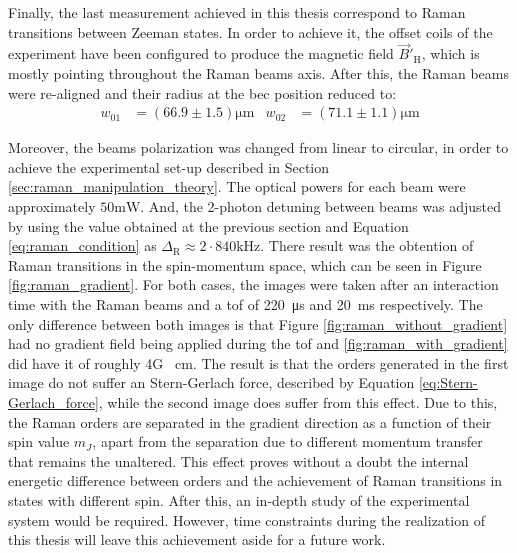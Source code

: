 Finally, the last measurement achieved in this thesis correspond to Raman transitions between Zeeman states. In order to achieve it, the offset coils of the experiment have been configured to produce the magnetic field $\vec{B}'_\text{H}$, which is mostly pointing throughout the Raman beams axis. After this, the Raman beams were re-aligned and their radius at the \ac{bec} position reduced to:
\begin{align*}
	w_{01} &= (66.9\pm1.5)\si{\micro\meter}   &   w_{02} &= (71.1\pm 1.1)\si{\micro\meter}
\end{align*}

Moreover, the beams polarization was changed from linear to circular, in order to achieve the experimental set-up described in Section \ref{sec:raman_manipulation_theory}. The optical powers for each beam were approximately $50\si{\milli\watt}$. And, the 2-photon detuning between beams was adjusted by using the value obtained at the previous section and Equation \eqref{eq:raman_condition} as $\Delta_\text{R} \approx 2\cdot840 \si{\kilo\hertz}$. There result was the obtention of Raman transitions in the spin-momentum space, which can be seen in Figure \ref{fig:raman_gradient}. For both cases, the images were taken after an interaction time with the Raman beams and a \ac{tof} of \SI{220}{\micro\second} and \SI{20}{\milli\second} respectively. The only difference between both images is that Figure \ref{fig:raman_without_gradient} had no gradient field being applied during the \ac{tof} and \ref{fig:raman_with_gradient} did have it of roughly 4G \si{\per\centi\meter}. The result is that the orders generated in the first image do not suffer an Stern-Gerlach force, described by Equation \ref{eq:Stern-Gerlach_force}, while the second image does suffer from this effect. Due to this, the Raman orders are separated in the gradient direction as a function of their spin value $m_J$, apart from the separation due to different momentum transfer that remains the unaltered. This effect proves without a doubt the internal energetic difference between orders and the achievement of Raman transitions in states with different spin. After this, an in-depth study of the experimental system would be required. However, time constraints during the realization of this thesis will leave this achievement aside for a future work.

